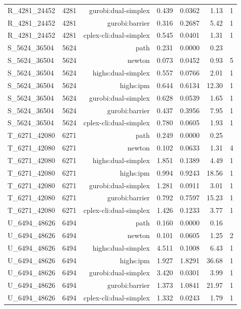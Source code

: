 \begin{longtable}{lrrrrrr}
R\_4281\_24452 & 4281 & gurobi:dual-simplex & 0.439 & 0.0362 & 1.13 & 1 \\
R\_4281\_24452 & 4281 & gurobi:barrier & 0.316 & 0.2687 & 5.42 & 1 \\
R\_4281\_24452 & 4281 & cplex-cli:dual-simplex & 0.545 & 0.0401 & 1.31 & 1 \\
S\_5624\_36504 & 5624 & path & 0.231 & 0.0000 & 0.23 &  \\
S\_5624\_36504 & 5624 & newton & 0.073 & 0.0452 & 0.93 & 5 \\
S\_5624\_36504 & 5624 & highs:dual-simplex & 0.557 & 0.0766 & 2.01 & 1 \\
S\_5624\_36504 & 5624 & highs:ipm & 0.644 & 0.6134 & 12.30 & 1 \\
S\_5624\_36504 & 5624 & gurobi:dual-simplex & 0.628 & 0.0539 & 1.65 & 1 \\
S\_5624\_36504 & 5624 & gurobi:barrier & 0.437 & 0.3956 & 7.95 & 1 \\
S\_5624\_36504 & 5624 & cplex-cli:dual-simplex & 0.780 & 0.0605 & 1.93 & 1 \\
T\_6271\_42080 & 6271 & path & 0.249 & 0.0000 & 0.25 &  \\
T\_6271\_42080 & 6271 & newton & 0.102 & 0.0633 & 1.31 & 4 \\
T\_6271\_42080 & 6271 & highs:dual-simplex & 1.851 & 0.1389 & 4.49 & 1 \\
T\_6271\_42080 & 6271 & highs:ipm & 0.994 & 0.9243 & 18.56 & 1 \\
T\_6271\_42080 & 6271 & gurobi:dual-simplex & 1.281 & 0.0911 & 3.01 & 1 \\
T\_6271\_42080 & 6271 & gurobi:barrier & 0.792 & 0.7597 & 15.23 & 1 \\
T\_6271\_42080 & 6271 & cplex-cli:dual-simplex & 1.426 & 0.1233 & 3.77 & 1 \\
U\_6494\_48626 & 6494 & path & 0.160 & 0.0000 & 0.16 &  \\
U\_6494\_48626 & 6494 & newton & 0.101 & 0.0605 & 1.25 & 2 \\
U\_6494\_48626 & 6494 & highs:dual-simplex & 4.511 & 0.1008 & 6.43 & 1 \\
U\_6494\_48626 & 6494 & highs:ipm & 1.927 & 1.8291 & 36.68 & 1 \\
U\_6494\_48626 & 6494 & gurobi:dual-simplex & 3.420 & 0.0301 & 3.99 & 1 \\
U\_6494\_48626 & 6494 & gurobi:barrier & 1.373 & 1.0841 & 21.97 & 1 \\
U\_6494\_48626 & 6494 & cplex-cli:dual-simplex & 1.332 & 0.0243 & 1.79 & 1 \\

\end{longtable}
